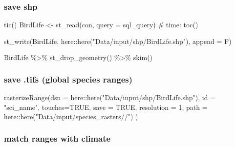 \documentclass[
  letterpaper,
  DIV=11,
  numbers=noendperiod]{scrreprt}
\newenvironment{Shaded}{\begin{snugshade}}{\end{snugshade}}
\newcommand{\AttributeTok}[1]{\textcolor[rgb]{0.40,0.45,0.13}{#1}}
\newcommand{\CommentTok}[1]{\textcolor[rgb]{0.37,0.37,0.37}{#1}}
\newcommand{\ConstantTok}[1]{\textcolor[rgb]{0.56,0.35,0.01}{#1}}
\newcommand{\DecValTok}[1]{\textcolor[rgb]{0.68,0.00,0.00}{#1}}
\newcommand{\FunctionTok}[1]{\textcolor[rgb]{0.28,0.35,0.67}{#1}}
\newcommand{\NormalTok}[1]{\textcolor[rgb]{0.00,0.23,0.31}{#1}}
\newcommand{\OtherTok}[1]{\textcolor[rgb]{0.00,0.23,0.31}{#1}}
\newcommand{\SpecialCharTok}[1]{\textcolor[rgb]{0.37,0.37,0.37}{#1}}
\newcommand{\StringTok}[1]{\textcolor[rgb]{0.13,0.47,0.30}{#1}}
\begin{document}
\hypertarget{save-shp}{%
\subsubsection{save shp}\label{save-shp}}

\begin{Shaded}
\begin{Highlighting}[]
\FunctionTok{tic}\NormalTok{()}
\NormalTok{BirdLife }\OtherTok{\textless{}{-}} \FunctionTok{st\_read}\NormalTok{(con, }\AttributeTok{query =}\NormalTok{ sql\_query) }\CommentTok{\# time:}
\FunctionTok{toc}\NormalTok{()}

\FunctionTok{st\_write}\NormalTok{(BirdLife, here}\SpecialCharTok{::}\FunctionTok{here}\NormalTok{(}\StringTok{"Data/input/shp/BirdLife.shp"}\NormalTok{), }\AttributeTok{append =}\NormalTok{ F)}

\NormalTok{BirdLife }\SpecialCharTok{\%\textgreater{}\%}
  \FunctionTok{st\_drop\_geometry}\NormalTok{() }\SpecialCharTok{\%\textgreater{}\%}
  \FunctionTok{skim}\NormalTok{()}
\end{Highlighting}
\end{Shaded}

\hypertarget{save-.tifs-global-species-ranges}{%
\subsubsection{save .tifs (global species
ranges)}\label{save-.tifs-global-species-ranges}}

\begin{Shaded}
\begin{Highlighting}[]
\FunctionTok{rasterizeRange}\NormalTok{(}\AttributeTok{dsn =}\NormalTok{ here}\SpecialCharTok{::}\FunctionTok{here}\NormalTok{(}\StringTok{"Data/input/shp/BirdLife.shp"}\NormalTok{),}
               \AttributeTok{id =} \StringTok{"sci\_name"}\NormalTok{, }\AttributeTok{touches=}\ConstantTok{TRUE}\NormalTok{, }\AttributeTok{save =} \ConstantTok{TRUE}\NormalTok{, }\AttributeTok{resolution =} \DecValTok{1}\NormalTok{,}
               \AttributeTok{path =}\NormalTok{ here}\SpecialCharTok{::}\FunctionTok{here}\NormalTok{(}\StringTok{"Data/input/species\_rasters//"}\NormalTok{)}
\NormalTok{)}
\end{Highlighting}
\end{Shaded}

\hypertarget{match-ranges-with-climate}{%
\subsubsection{match ranges with
climate}\label{match-ranges-with-climate}}
\end{document}

